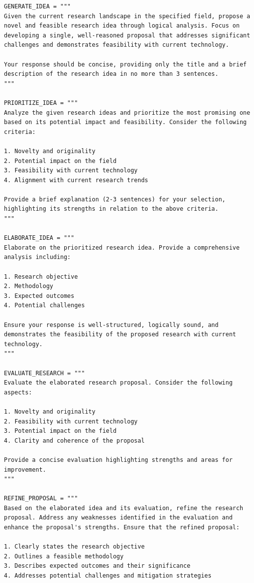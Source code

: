 \begin{tcolorbox}[title={\textbf{\small Idea generation workflow}}, boxrule=2pt, arc=0mm, breakable]\begin{verbatim}
GENERATE_IDEA = """
Given the current research landscape in the specified field, propose a novel and feasible research idea through logical analysis. Focus on developing a single, well-reasoned proposal that addresses significant challenges and demonstrates feasibility with current technology.

Your response should be concise, providing only the title and a brief description of the research idea in no more than 3 sentences.
"""

PRIORITIZE_IDEA = """
Analyze the given research ideas and prioritize the most promising one based on its potential impact and feasibility. Consider the following criteria:

1. Novelty and originality
2. Potential impact on the field
3. Feasibility with current technology
4. Alignment with current research trends

Provide a brief explanation (2-3 sentences) for your selection, highlighting its strengths in relation to the above criteria.
"""

ELABORATE_IDEA = """
Elaborate on the prioritized research idea. Provide a comprehensive analysis including:

1. Research objective
2. Methodology
3. Expected outcomes
4. Potential challenges

Ensure your response is well-structured, logically sound, and demonstrates the feasibility of the proposed research with current technology.
"""

EVALUATE_RESEARCH = """
Evaluate the elaborated research proposal. Consider the following aspects:

1. Novelty and originality
2. Feasibility with current technology
3. Potential impact on the field
4. Clarity and coherence of the proposal

Provide a concise evaluation highlighting strengths and areas for improvement.
"""

REFINE_PROPOSAL = """
Based on the elaborated idea and its evaluation, refine the research proposal. Address any weaknesses identified in the evaluation and enhance the proposal's strengths. Ensure that the refined proposal:

1. Clearly states the research objective
2. Outlines a feasible methodology
3. Describes expected outcomes and their significance
4. Addresses potential challenges and mitigation strategies


\end{verbatim}
\end{tcolorbox}
